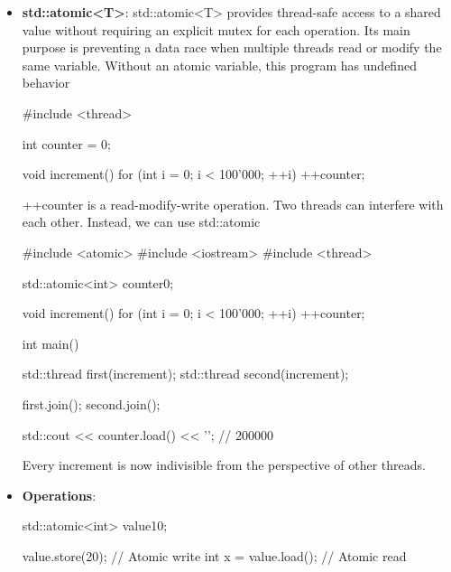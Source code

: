 \documentclass{report}
\begin{document}
    \begin{itemize}
        \item \textbf{std::atomic<T>}: std::atomic<T> provides thread-safe access to a shared value without requiring an explicit mutex for each operation.        
            \bigbreak \noindent 
            Its main purpose is preventing a data race when multiple threads read or modify the same variable.
            \bigbreak \noindent 
            Without an atomic variable, this program has undefined behavior
            \bigbreak \noindent 
            \begin{cppcode}
                #include <thread>

                int counter = 0;

                void increment()
                {
                    for (int i = 0; i < 100'000; ++i) {
                        ++counter;
                    }
                }
            \end{cppcode}
            \bigbreak \noindent 
            ++counter is a read-modify-write operation. Two threads can interfere with each other. Instead, we can use std::atomic
            \bigbreak \noindent 
            \begin{cppcode}
                #include <atomic>
                #include <iostream>
                #include <thread>

                std::atomic<int> counter{0};

                void increment()
                {
                    for (int i = 0; i < 100'000; ++i) {
                        ++counter;
                    }
                }

                int main()
                {
                    std::thread first(increment);
                    std::thread second(increment);

                    first.join();
                    second.join();

                    std::cout << counter.load() << '\n';  // 200000
                }
            \end{cppcode}
            \bigbreak \noindent 
            Every increment is now indivisible from the perspective of other threads.
        \item \textbf{Operations}: 
            \bigbreak \noindent 
            \begin{cppcode}
                std::atomic<int> value{10};

                value.store(20);          // Atomic write
                int x = value.load();     // Atomic read


\end{cppcode}
\end{itemize}
\end{document}

